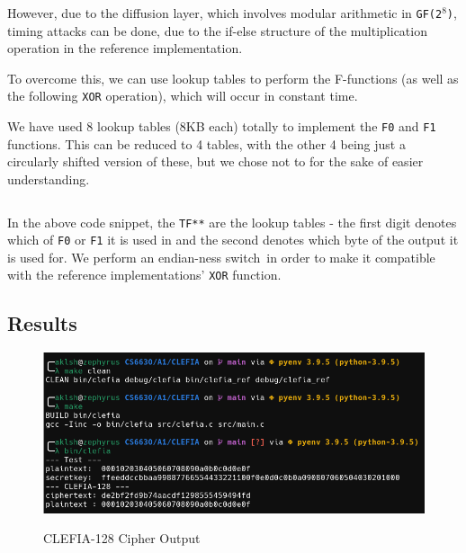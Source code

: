 \documentclass[12pt,a4paper,english]{paper}
\newenvironment{colorboxed}[4][gray]{
\begin{tcolorbox}[colback=#1!3!white,colframe=#1(ryb)!50!black,title=\textbf{#2 #3},#4]
}{
\end{tcolorbox}
}
\begin{document}
However, due to the diffusion layer, which involves modular arithmetic in \texttt{GF(2$^\text{8}$)}, timing attacks can be done, due to the if-else structure of the multiplication operation in the reference implementation.

To overcome this, we can use lookup tables to perform the F-functions (as well as the following \texttt{XOR} operation), which will occur in constant time\footnotemark.


We have used 8 lookup tables (8KB each) totally to implement the \texttt{F0} and \texttt{F1} functions. This can be reduced to 4 tables, with the other 4 being just a circularly shifted version of these, but we chose not to for the sake of easier understanding.

\begin{colorboxed}{\texttt{F0}, \texttt{F1} functions}{}{breakable}
    \inputminted[baselinestretch=0.85,breaklines,firstline=367,lastline=401,fontsize=\footnotesize]{c}{CLEFIA/src/clefia.c}
\end{colorboxed}

In the above code snippet, the \texttt{TF**} are the lookup tables - the first digit denotes which of \texttt{F0} or \texttt{F1} it is used in and the second denotes which byte of the output it is used for. We perform an endian-ness switch\footnotemark\ in order to make it compatible with the reference implementations' \texttt{XOR} function.


\subsection{Results}
\begin{figure}[H]
    \centering
    \includegraphics[scale=0.4]{Q1_output.png}
    \label{fig:clefia_cipher}
    \caption{CLEFIA-128 Cipher Output}
\end{figure}
\end{document}
